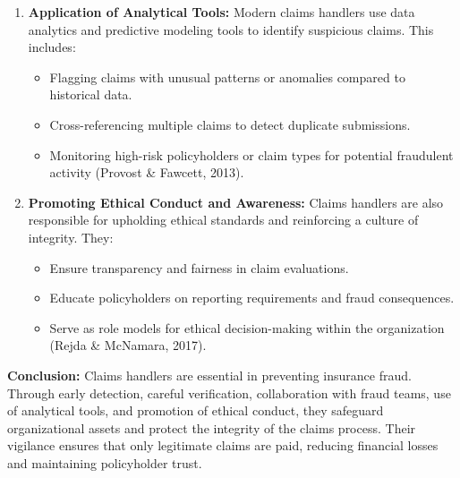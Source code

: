 \documentclass[12pt,a4paper]{article}
\begin{document}
\begin{enumerate}
    \item \textbf{Application of Analytical Tools:} Modern claims handlers use data analytics and predictive modeling tools to identify suspicious claims. This includes:
    \begin{itemize}
        \item Flagging claims with unusual patterns or anomalies compared to historical data.
        \item Cross-referencing multiple claims to detect duplicate submissions.
        \item Monitoring high-risk policyholders or claim types for potential fraudulent activity (Provost \& Fawcett, 2013).
    \end{itemize}

    \item \textbf{Promoting Ethical Conduct and Awareness:} Claims handlers are also responsible for upholding ethical standards and reinforcing a culture of integrity. They:
    \begin{itemize}
        \item Ensure transparency and fairness in claim evaluations.
        \item Educate policyholders on reporting requirements and fraud consequences.
        \item Serve as role models for ethical decision-making within the organization (Rejda \& McNamara, 2017).
    \end{itemize}
\end{enumerate}

\begin{example}
\textbf{Conclusion:} Claims handlers are essential in preventing insurance fraud. Through early detection, careful verification, collaboration with fraud teams, use of analytical tools, and promotion of ethical conduct, they safeguard organizational assets and protect the integrity of the claims process. Their vigilance ensures that only legitimate claims are paid, reducing financial losses and maintaining policyholder trust.
\end{example}
\end{document}
